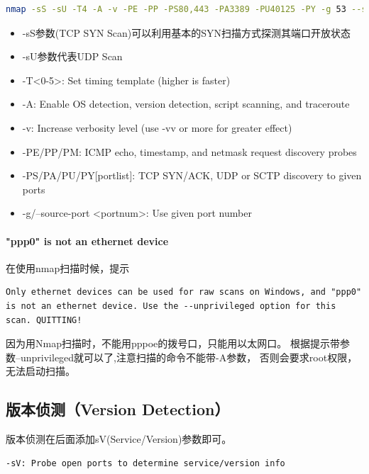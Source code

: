 \documentclass[letter]{book}
\begin{document}
\begin{lstlisting}[language=Bash]
nmap -sS -sU -T4 -A -v -PE -PP -PS80,443 -PA3389 -PU40125 -PY -g 53 --script "default or (discovery and safe)" 12.26.32.14 
\end{lstlisting}

\begin{itemize}
	\item{-sS参数(TCP SYN Scan)可以利用基本的SYN扫描方式探测其端口开放状态}
	\item{-sU参数代表UDP Scan}
	\item{-T<0-5>: Set timing template (higher is faster)}
	\item{-A: Enable OS detection, version detection, script scanning, and traceroute}
	\item{-v: Increase verbosity level (use -vv or more for greater effect)}
	\item{-PE/PP/PM: ICMP echo, timestamp, and netmask request discovery probes}
	\item{-PS/PA/PU/PY[portlist]: TCP SYN/ACK, UDP or SCTP discovery to given ports}
	\item{-g/--source-port <portnum>: Use given port number}
\end{itemize}


\paragraph{"ppp0" is not an ethernet device}在使用nmap扫描时候，提示 

\begin{lstlisting}
Only ethernet devices can be used for raw scans on Windows, and "ppp0" is not an ethernet device. Use the --unprivileged option for this scan. QUITTING!
\end{lstlisting}

因为用Nmap扫描时，不能用pppoe的拨号口，只能用以太网口。
根据提示带参数--unprivileged就可以了,注意扫描的命令不能带-A参数，
否则会要求root权限，无法启动扫描。 


\subsection{版本侦测（Version Detection）}

版本侦测在后面添加sV(Service/Version)参数即可。

\begin{lstlisting}[language=Bash]
-sV: Probe open ports to determine service/version info
\end{lstlisting}
\end{document}
